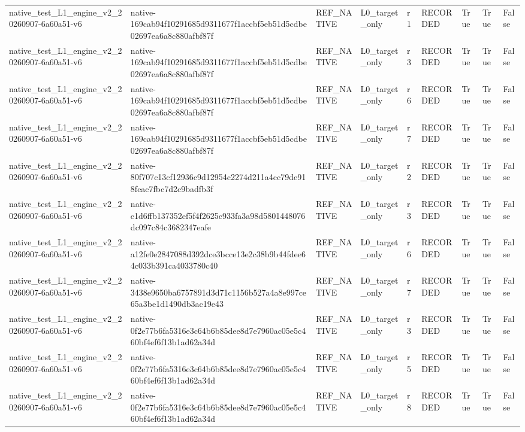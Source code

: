 \begin{tabular}{lllllllll}
native\_test\_L1\_engine\_v2\_20260907-6a60a51-v6 & native-169cab94f10291685d9311677f1accbf5eb51d5cdbe02697ea6a8c880afbf87f & REF\_NATIVE & L0\_target\_only & r1 & RECORDED & True & True & False \\
native\_test\_L1\_engine\_v2\_20260907-6a60a51-v6 & native-169cab94f10291685d9311677f1accbf5eb51d5cdbe02697ea6a8c880afbf87f & REF\_NATIVE & L0\_target\_only & r3 & RECORDED & True & True & False \\
native\_test\_L1\_engine\_v2\_20260907-6a60a51-v6 & native-169cab94f10291685d9311677f1accbf5eb51d5cdbe02697ea6a8c880afbf87f & REF\_NATIVE & L0\_target\_only & r6 & RECORDED & True & True & False \\
native\_test\_L1\_engine\_v2\_20260907-6a60a51-v6 & native-169cab94f10291685d9311677f1accbf5eb51d5cdbe02697ea6a8c880afbf87f & REF\_NATIVE & L0\_target\_only & r7 & RECORDED & True & True & False \\
native\_test\_L1\_engine\_v2\_20260907-6a60a51-v6 & native-80f707c13cf12936c9d12954c2274d211a4cc79de918feac7fbc7d2c9badfb3f & REF\_NATIVE & L0\_target\_only & r2 & RECORDED & True & True & False \\
native\_test\_L1\_engine\_v2\_20260907-6a60a51-v6 & native-c1d6ffb137352ef5f4f2625c933fa3a98d5801448076dc097c84c3682347eafe & REF\_NATIVE & L0\_target\_only & r3 & RECORDED & True & True & False \\
native\_test\_L1\_engine\_v2\_20260907-6a60a51-v6 & native-a12fe0e2847088d392dce3bcce13e2c38b9b44fdee64c033b391ca4033780c40 & REF\_NATIVE & L0\_target\_only & r6 & RECORDED & True & True & False \\
native\_test\_L1\_engine\_v2\_20260907-6a60a51-v6 & native-3438e9650ba6757891d3d71c1156b527a4a8e997ce65a3be1d1490db3ac19e43 & REF\_NATIVE & L0\_target\_only & r7 & RECORDED & True & True & False \\
native\_test\_L1\_engine\_v2\_20260907-6a60a51-v6 & native-0f2e77b6fa5316e3c64b6b85dee8d7e7960ac05e5c460bf4ef6f13b1ad62a34d & REF\_NATIVE & L0\_target\_only & r3 & RECORDED & True & True & False \\
native\_test\_L1\_engine\_v2\_20260907-6a60a51-v6 & native-0f2e77b6fa5316e3c64b6b85dee8d7e7960ac05e5c460bf4ef6f13b1ad62a34d & REF\_NATIVE & L0\_target\_only & r5 & RECORDED & True & True & False \\
native\_test\_L1\_engine\_v2\_20260907-6a60a51-v6 & native-0f2e77b6fa5316e3c64b6b85dee8d7e7960ac05e5c460bf4ef6f13b1ad62a34d & REF\_NATIVE & L0\_target\_only & r8 & RECORDED & True & True & False \\

\end{tabular}
